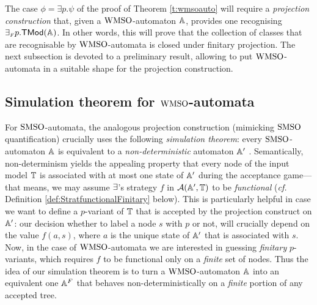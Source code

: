 {\color{blue} The case $\phi = \exists p. \psi$ of the proof of Theorem \ref{t:wmsoauto} will require a \emph{projection construction} that, given a $\mathrm{WMSO}$-automaton
$\mathbb{A}$, provides one recognising ${\exists_{{\scriptscriptstyle F}} p}.\mathsf{TMod}(\mathbb{A})$. In other words, this will  prove that 
the collection of classes that are recognisable by $\mathrm{WMSO}$-automata is closed under finitary projection. The next subsection is devoted to a preliminary result, allowing to put $\mathrm{WMSO}$-automata in a suitable shape for the projection construction.} %

\subsection{Simulation theorem for $\mathrm{WMSO}$-automata}
\label{sec:simulationwmso}

\noindent
For $\mathrm{SMSO}$-automata, the analogous projection construction {\color{blue}(mimicking $\mathrm{SMSO}$ quantification)} crucially uses the following
\emph{simulation theorem}: every $\mathrm{SMSO}$-automaton $\mathbb{A}$ is equivalent to a
\emph{non-deterministic} automaton $\mathbb{A}'$ \cite{Walukiewicz96}.
Semantically, non-determinism yields the appealing property that every node of
the input model $\mathbb{T}$ is associated with at most one state of $\mathbb{A}'$ during
the acceptance game--- that means, we may assume $\exists$'s strategy $f$ in
$\mathcal{A}(\mathbb{A}',\mathbb{T})$ to be \emph{functional} (\emph{cf.}
Definition \ref{def:StratfunctionalFinitary} below).
This is particularly helpful in case we want to define a $p$-variant of $\mathbb{T}$
that is accepted by the projection construct on $\mathbb{A}'$: our decision whether
to label a node $s$ with $p$ or not, will crucially depend on the value
$f(a,s)$, where $a$ is the unique state of $\mathbb{A}'$ that is associated with $s$.
Now, in the case of $\mathrm{WMSO}$-automata we are interested in guessing
\emph{finitary} $p$-variants, which requires $f$ to be functional only on a
\emph{finite} set of nodes.
Thus the idea of our simulation theorem is to turn a $\mathrm{WMSO}$-automaton $\mathbb{A}$
into an equivalent one $\mathbb{A}^{F}$ that behaves non-deterministically on a
\emph{finite} portion of any accepted tree.

